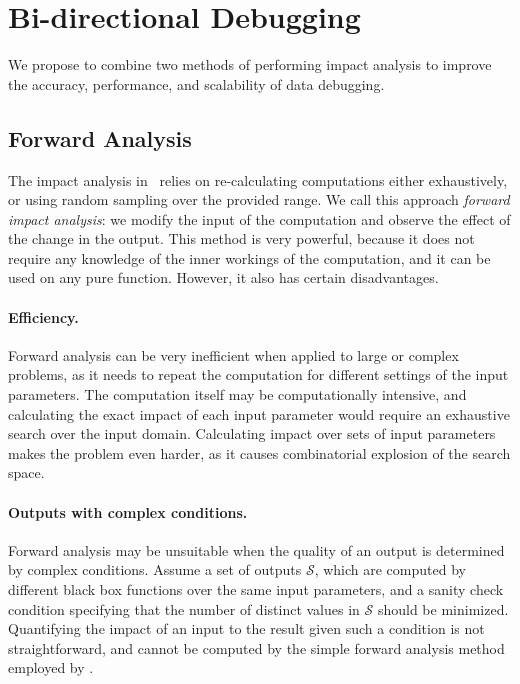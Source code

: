 \section{Bi-directional Debugging} %
\label{sec:bi_directional_debugging}

We propose to combine two methods of performing impact analysis to improve the accuracy, performance, and scalability of data debugging.

\subsection{Forward Analysis} %
\label{sub:forward_analysis}
The impact analysis in \checkcell\ relies on re-calculating computations either exhaustively, or using random sampling over the provided range. We call this approach \emph{forward impact analysis}: we modify the input of the computation and observe the effect of the change in the output. This method is very powerful, because it does not require any knowledge of the inner workings of the computation, and it can be used on any pure function. However, it also has certain disadvantages.

\paragraph{Efficiency.} %
\label{par:efficiency}
Forward analysis can be very inefficient when applied to large or complex problems, as it needs to repeat the computation for different settings of the input parameters. The computation itself may be computationally intensive, and calculating the exact impact of each input parameter would require an exhaustive search over the input domain. Calculating impact over sets of input parameters makes the problem even harder, as it causes combinatorial explosion of the search space. 

\paragraph{Outputs with complex conditions.} %
\label{par:outputs_with_complex_conditions}
Forward analysis may be unsuitable when the quality of an output is determined by complex conditions. Assume a set of outputs $\mathcal{S}$, which are computed by different black box functions over the same input parameters, and a sanity check condition specifying that the number of distinct values in $\mathcal{S}$ should be minimized. Quantifying the impact of an input to the result given such a condition is not straightforward, and cannot be computed by the simple forward analysis method employed by \checkcell.


